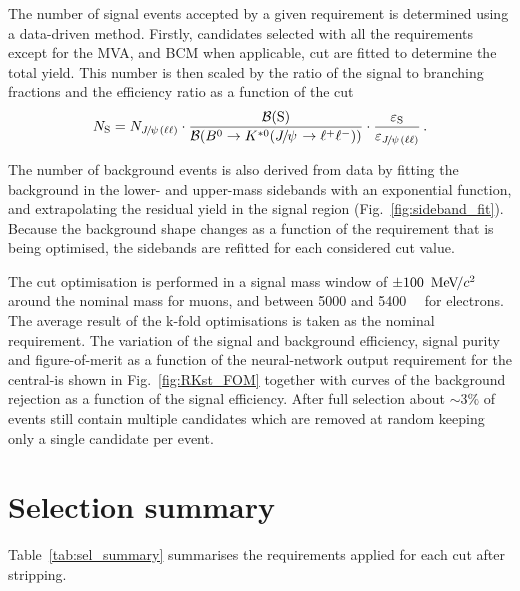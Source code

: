 The number of signal events accepted by a given requirement is determined using a data-driven method.
Firstly, \BdToKstJPsll candidates selected with all the requirements except for the MVA, and BCM when applicable,
cut are fitted to determine the total yield. 
This number is then scaled by the ratio of the signal to \BdToKstJPsll branching fractions and
the efficiency ratio as a function of the cut
%
$$N_{\mathrm{S}} = N_{\jpsi(\ell\ell)} \cdot
\frac{\BR(\mathrm{S})}{\BR(\BdToKstJPsll)} \cdot
\frac{\varepsilon_{\mathrm{S}}}{\varepsilon_{\jpsi(\ell\ell)}} \, .$$

The number of background events is also derived from data by fitting the background in the lower- and upper-mass sidebands with an exponential function, and extrapolating the residual yield in the signal region (Fig.~\ref{fig:sideband_fit}).
Because the background shape changes as a function of the requirement that is being optimised, the sidebands are refitted for each considered cut value.
%

The cut optimisation is performed in a signal mass window of $\pm100~{\mathrm{\,Me\kern -0.1em V\!/}c^2}$ around the nominal \Bz mass for muons, and between 5000 and 5400~\mevcc~ for electrons.
The average result of the k-fold optimisations is taken as the nominal requirement.
%
%
%
The variation of the signal and background efficiency, signal purity and figure-of-merit as a function of the neural-network output
requirement for the central-\qsq is shown in Fig.~\ref{fig:RKst_FOM}
together with curves of the background rejection as a function of the signal efficiency.
%
%
After full selection about $\sim 3\%$ of events still contain multiple candidates
which are removed at random keeping only a single candidate per event.

\clearpage

\section{Selection summary}

Table~\ref{tab:sel_summary} summarises the requirements applied for each cut after stripping.

